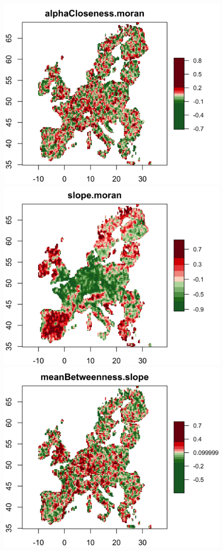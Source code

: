 \begin{figure}
\includegraphics[width=0.48\linewidth]{Figures/StaticCorrelations/EU_corr_alphaCloseness_moran_rhoasize12}
\includegraphics[width=0.48\linewidth]{Figures/StaticCorrelations/EU_corr_slope_moran_rhoasize12}\\
\includegraphics[width=0.48\linewidth]{Figures/StaticCorrelations/EU_corr_meanBetweenness_slope_rhoasize12}
\label{fig:app:staticcorrelations:europe_correlations}
\end{figure}







%




